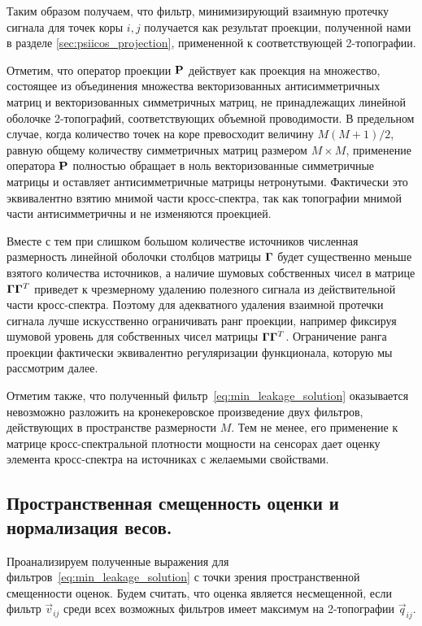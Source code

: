 Таким образом получаем, что фильтр, минимизирующий взаимную протечку сигнала
для точек коры $i, j$ получается как результат проекции, полученной нами в
разделе \ref{sec:psiicos_projection}, примененной к соответствующей
2-топографии.

Отметим, что оператор проекции $\mathbf{P}$ действует как проекция на множество,
состоящее из объединения множества векторизованных антисимметричных матриц и
векторизованных симметричных матриц, не принадлежащих линейной оболочке
2-топографий, соответствующих объемной проводимости. В предельном случае, когда
количество точек на коре превосходит величину $M (M + 1) / 2$, равную общему
количеству симметричных матриц размером $M \times M$, применение оператора
$\mathbf{P}$ полностью обращает в ноль векторизованные симметричные матрицы и оставляет
антисимметричные матрицы нетронутыми. Фактически это эквивалентно взятию
мнимой части кросс-спектра, так как топографии мнимой части антисимметричны и
не изменяются проекцией.

Вместе с тем при слишком большом количестве источников численная размерность
линейной оболочки столбцов матрицы $\mathbf{\Gamma}$ будет существенно меньше
взятого количества источников, а наличие шумовых собственных чисел в матрице
$\mathbf{\Gamma} \mathbf{\Gamma}^T$ приведет к чрезмерному удалению полезного
сигнала из действительной части кросс-спектра. Поэтому для адекватного удаления
взаимной протечки сигнала лучше искусственно ограничивать ранг проекции,
например фиксируя шумовой уровень для собственных чисел матрицы $\mathbf{\Gamma}
\mathbf{\Gamma}^T$. Ограничение ранга проекции фактически эквивалентно
регуляризации функционала, которую мы рассмотрим далее.

Отметим также, что полученный фильтр~\ref{eq:min_leakage_solution} оказывается
невозможно разложить на кронекеровское произведение двух фильтров, действующих
в пространстве размерности $M$. Тем не менее, его применение к матрице
кросс-спектральной плотности мощности на сенсорах дает оценку элемента кросс-спектра на
источниках с желаемыми свойствами.

\subsection{Пространственная смещенность оценки и нормализация весов.}\label{subsec:psiicos_normalization_and_spatial_bias}

Проанализируем полученные выражения для фильтров~\ref{eq:min_leakage_solution}
с точки зрения пространственной смещенности оценок. Будем считать, что оценка
является несмещенной, если фильтр $\vec{v}_{ij}$ среди всех возможных фильтров
имеет максимум на 2-топографии $\vec{q}_{ij}$. 

